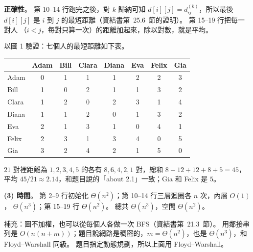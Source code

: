 \begin{pastsoln}
\textbf{正確性}。 第 10--14 行跑完之後，對 $k$ 歸納可知 $d[i][j] = d^{(k)}_{ij}$，所以最後
$d[i][j]$ 是 $i$ 到 $j$ 的最短距離（資結書第~25.6~節的證明）。 第 15--19 行把每一對人
（$i < j$，每對只算一次）的距離加起來，除以對數，就是平均。

以圖 1 驗證：七個人的最短距離如下表。
\begin{center}
\small
\begin{tabular}{lccccccc}
\toprule
 & Adam & Bill & Clara & Diana & Eva & Felix & Gia \\
\midrule
Adam  & 0 & 1 & 1 & 1 & 2 & 2 & 3 \\
Bill  & 1 & 0 & 2 & 1 & 1 & 3 & 2 \\
Clara & 1 & 2 & 0 & 2 & 3 & 1 & 4 \\
Diana & 1 & 1 & 2 & 0 & 1 & 3 & 2 \\
Eva   & 2 & 1 & 3 & 1 & 0 & 4 & 1 \\
Felix & 2 & 3 & 1 & 3 & 4 & 0 & 5 \\
Gia   & 3 & 2 & 4 & 2 & 1 & 5 & 0 \\
\bottomrule
\end{tabular}
\end{center}
$21$ 對裡距離為 $1, 2, 3, 4, 5$ 的各有 $8, 6, 4, 2, 1$ 對，總和
$8 + 12 + 12 + 8 + 5 = 45$，平均 $45 / 21 \approx 2.14$，和題目說的「about 2.1」一致；Gia 和 Felix
是 $5$。

\textbf{(3) 時間}。 第 2--9 行初始化 $\Theta(n^2)$；第 10--14 行三層迴圈各 $n$ 次，內層 $O(1)$，
$\Theta(n^3)$；第 15--19 行 $\Theta(n^2)$。 總共 $\Theta(n^3)$，空間 $\Theta(n^2)$。

補充：圖不加權，也可以從每個人各做一次 BFS（資結書第~21.3~節）。 用鄰接串列是
$O(n(n + m))$；題目說網路是稠密的，$m = \Theta(n^2)$，也是 $\Theta(n^3)$，和 Floyd--Warshall
同級。 題目指定動態規劃，所以上面用 Floyd--Warshall。
\end{pastsoln}

